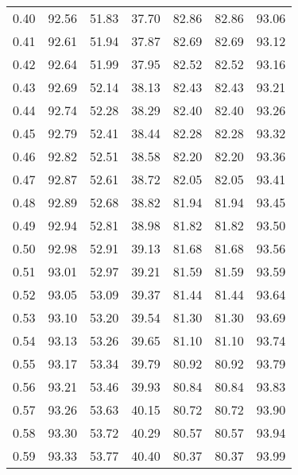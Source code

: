 \begin{tabular}{|c|c|c|c|c|c|c|}
      0.40 &     92.56 &     51.83 &      37.70 &   82.86 &      82.86 &         93.06 \\
      0.41 &     92.61 &     51.94 &      37.87 &   82.69 &      82.69 &         93.12 \\
      0.42 &     92.64 &     51.99 &      37.95 &   82.52 &      82.52 &         93.16 \\
      0.43 &     92.69 &     52.14 &      38.13 &   82.43 &      82.43 &         93.21 \\
      0.44 &     92.74 &     52.28 &      38.29 &   82.40 &      82.40 &         93.26 \\
      0.45 &     92.79 &     52.41 &      38.44 &   82.28 &      82.28 &         93.32 \\
      0.46 &     92.82 &     52.51 &      38.58 &   82.20 &      82.20 &         93.36 \\
      0.47 &     92.87 &     52.61 &      38.72 &   82.05 &      82.05 &         93.41 \\
      0.48 &     92.89 &     52.68 &      38.82 &   81.94 &      81.94 &         93.45 \\
      0.49 &     92.94 &     52.81 &      38.98 &   81.82 &      81.82 &         93.50 \\
      0.50 &     92.98 &     52.91 &      39.13 &   81.68 &      81.68 &         93.56 \\
      0.51 &     93.01 &     52.97 &      39.21 &   81.59 &      81.59 &         93.59 \\
      0.52 &     93.05 &     53.09 &      39.37 &   81.44 &      81.44 &         93.64 \\
      0.53 &     93.10 &     53.20 &      39.54 &   81.30 &      81.30 &         93.69 \\
      0.54 &     93.13 &     53.26 &      39.65 &   81.10 &      81.10 &         93.74 \\
      0.55 &     93.17 &     53.34 &      39.79 &   80.92 &      80.92 &         93.79 \\
      0.56 &     93.21 &     53.46 &      39.93 &   80.84 &      80.84 &         93.83 \\
      0.57 &     93.26 &     53.63 &      40.15 &   80.72 &      80.72 &         93.90 \\
      0.58 &     93.30 &     53.72 &      40.29 &   80.57 &      80.57 &         93.94 \\
      0.59 &     93.33 &     53.77 &      40.40 &   80.37 &      80.37 &         93.99 \\

\end{tabular}

